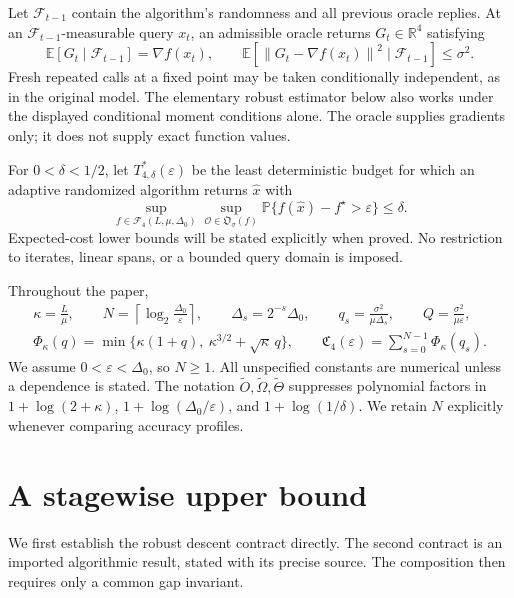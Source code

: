\documentclass[11pt,a4paper]{article}
\newcommand{\R}{\mathbb R}
\newcommand{\E}{\mathbb E}
\newcommand{\Prb}{\mathbb P}
\newcommand{\eps}{\varepsilon}
\newcommand{\norm}[1]{\left\lVert #1\right\rVert}
\newcommand{\tO}{\widetilde O}
\newcommand{\tOmega}{\widetilde\Omega}
\newcommand{\tTheta}{\widetilde\Theta}
\newcommand{\profile}{\mathfrak C_4}
\theoremstyle{definition}
\theoremstyle{remark}
\begin{document}
Let $\mathcal F_{t-1}$ contain the algorithm's randomness and all
previous oracle replies.  At an $\mathcal F_{t-1}$-measurable query
$x_t$, an admissible oracle returns $G_t\in\R^4$ satisfying
\begin{equation}
 \E[G_t\mid\mathcal F_{t-1}]=\nabla f(x_t),
 \qquad
 \E[\norm{G_t-\nabla f(x_t)}^2\mid\mathcal F_{t-1}]
 \le\sigma^2.
 \label{eq:oracle}
\end{equation}
Fresh repeated calls at a fixed point may be taken conditionally
independent, as in the original model.  The elementary robust
estimator below also works under the displayed conditional moment
conditions alone.  The oracle supplies gradients only; it does not
supply exact function values.

For $0<\delta<1/2$, let $T^*_{4,\delta}(\eps)$ be the least
deterministic budget for which an adaptive randomized algorithm
returns $\widehat x$ with
\[
 \sup_{f\in\mathcal F_4(L,\mu,\Delta_0)}
 \sup_{\mathcal O\in\mathfrak O_\sigma(f)}
 \Prb\{f(\widehat x)-f^\star>\eps\}\le\delta .
\]
Expected-cost lower bounds will be stated explicitly when proved.
No restriction to iterates, linear spans, or a bounded query domain
is imposed.

Throughout the paper,
\begin{gather}
 \kappa=\frac L\mu,\qquad
 N=\left\lceil\log_2\frac{\Delta_0}{\eps}\right\rceil,\qquad
 \Delta_s=2^{-s}\Delta_0,\qquad
 q_s=\frac{\sigma^2}{\mu\Delta_s},\qquad
 Q=\frac{\sigma^2}{\mu\eps}, \label{eq:parameters}\\
 \Phi_\kappa(q)=
 \min\{\kappa(1+q),\ \kappa^{3/2}+\sqrt\kappa\,q\},
 \qquad
 \profile(\eps)=\sum_{s=0}^{N-1}\Phi_\kappa(q_s).
 \label{eq:profile}
\end{gather}
We assume $0<\eps<\Delta_0$, so $N\ge1$.  All unspecified constants
are numerical unless a dependence is stated.  The notation
$\tO,\tOmega,\tTheta$ suppresses polynomial factors in
$1+\log(2+\kappa)$, $1+\log(\Delta_0/\eps)$, and
$1+\log(1/\delta)$.  We retain $N$ explicitly whenever comparing
accuracy profiles.

\section{A stagewise upper bound}
\label{sec:upper}

We first establish the robust descent contract directly.  The second
contract is an imported algorithmic result, stated with its precise
source.  The composition then requires only a common gap invariant.
\end{document}
